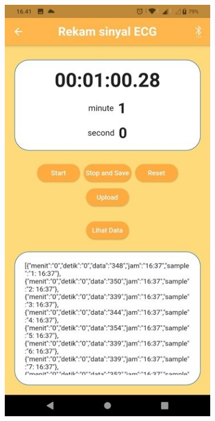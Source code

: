 \begin{figure}[H] \centering
	\begin{subfigure}{0.45\textwidth}
		\centering
		\includegraphics[width=1\linewidth]{img/percob/Slide15a}	  
		\caption{}		
	\end{subfigure}

\end{figure}
